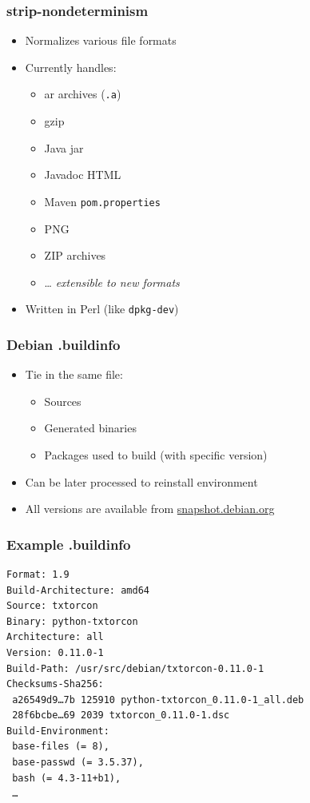 \documentclass[14pt]{beamer}
\begin{document}
\begin{frame}
 \frametitle{strip-nondeterminism}

 \begin{itemize}
  \item Normalizes various file formats
  \item Currently handles:
   \begin{itemize}
    \item ar archives (\texttt{.a})
    \item gzip
    \item Java jar
    \item Javadoc HTML
    \item Maven \texttt{pom.properties}
    \item PNG
    \item ZIP archives
    \item … \textit{extensible to new formats}
   \end{itemize}
  \item Written in Perl (like \texttt{dpkg-dev})
 \end{itemize}
\end{frame}

\begin{frame}
 \frametitle{Debian .buildinfo}

 \begin{itemize}
  \item Tie in the same file:
   \begin{itemize}
    \item Sources
    \item Generated binaries
    \item Packages used to build (with specific version)
   \end{itemize}
  \item Can be later processed to reinstall environment
  \item All versions are available from \url{snapshot.debian.org}
 \end{itemize}
\end{frame}

\begin{frame}[fragile]
 \frametitle{Example .buildinfo}

{\small
\begin{verbatim}
Format: 1.9
Build-Architecture: amd64
Source: txtorcon
Binary: python-txtorcon
Architecture: all
Version: 0.11.0-1
Build-Path: /usr/src/debian/txtorcon-0.11.0-1
Checksums-Sha256:
 a26549d9…7b 125910 python-txtorcon_0.11.0-1_all.deb
 28f6bcbe…69 2039 txtorcon_0.11.0-1.dsc
Build-Environment:
 base-files (= 8),
 base-passwd (= 3.5.37),
 bash (= 4.3-11+b1),
 …
\end{verbatim}
}
\end{frame}
\end{document}

